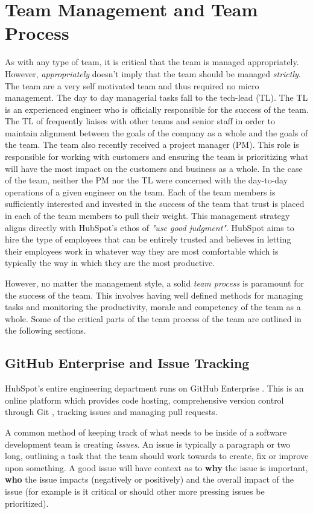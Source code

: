 \chapter{Team Management and Team Process}
As with any type of team, it is critical that the team is managed appropriately. However, \textit{appropriately} doesn't imply that the team should be managed \textit{strictly}. The \team{} team are a very self motivated team and thus required no micro management. The day to day managerial tasks fall to the tech-lead (TL). The TL is an experienced engineer who is officially responsible for the success of the team. The TL of \team{} frequently liaises with other teams and senior staff in order to maintain alignment between the goals of the company as a whole and the goals of the team. The \team{} team also recently received a project manager (PM). This role is responsible for working with customers and ensuring the team is prioritizing what will have the most impact on the customers and business as a whole. In the case of the \team{} team, neither the PM nor the TL were concerned with the day-to-day operations of a given engineer on the team. Each of the team members is sufficiently interested and invested in the success of the team that trust is placed in each of the team members to pull their weight. This management strategy aligns directly with HubSpot's ethos of \textit{"use good judgment"}. HubSpot aims to hire the type of employees that can be entirely trusted and believes in letting their employees work in whatever way they are most comfortable which is typically the way in which they are the most productive.

However, no matter the management style, a solid \textit{team process} is paramount for the success of the team. This involves having well defined methods for managing tasks and monitoring the productivity, morale and competency of the team as a whole. Some of the critical parts of the team process of the \team{} team are outlined in the following sections.

\section{GitHub Enterprise and Issue Tracking}\label{sec:issueTracking}
HubSpot's entire engineering department runs on GitHub Enterprise \cite{githubEnterp}. This is an online platform which provides code hosting, comprehensive version control through Git \cite{git}, tracking issues and managing pull requests. 

A common method of keeping track of what needs to be inside of a software development team is creating \textit{issues}. An issue is typically a paragraph or two long, outlining a task that the team should work towards to create, fix or improve upon something. A good issue will have context as to \textbf{why} the issue is important, \textbf{who} the issue impacts (negatively or positively) and the overall impact of the issue (for example is it critical or should other more pressing issues be prioritized). 

